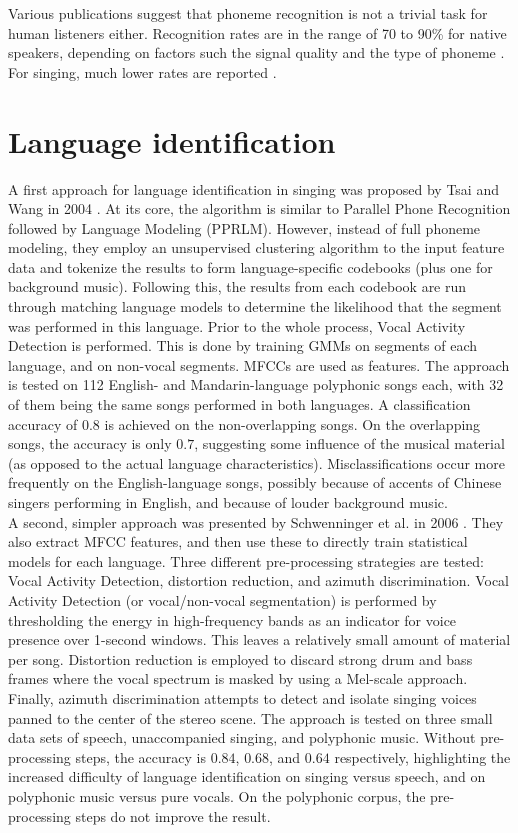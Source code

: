 Various publications suggest that phoneme recognition is not a trivial task for human listeners either. Recognition rates are in the range of 70 to 90\% for native speakers, depending on factors such the signal quality and the type of phoneme \cite{weber_smits}\cite{meyer_waechter}. For singing, much lower rates are reported \cite{hollien}.


\section{Language identification}
A first approach for language identification in singing was proposed by Tsai and Wang in 2004 \cite{tsai_wang}. At its core, the algorithm is similar to Parallel Phone Recognition followed by Language Modeling (PPRLM). However, instead of full phoneme modeling, they employ an unsupervised clustering algorithm to the input feature data and tokenize the results to form language-specific codebooks (plus one for background music). Following this, the results from each codebook are run through matching language models to determine the likelihood that the segment was performed in this language. Prior to the whole process, Vocal Activity Detection is performed. This is done by training GMMs on segments of each language, and on non-vocal segments. MFCCs are used as features.
The approach is tested on 112 English- and Mandarin-language polyphonic songs each, with 32 of them being the same songs performed in both languages. A classification accuracy of $0.8$ is achieved on the non-overlapping songs. On the overlapping songs, the accuracy is only $0.7$, suggesting some influence of the musical material (as opposed to the actual language characteristics). Misclassifications occur more frequently on the English-language songs, possibly because of accents of Chinese singers performing in English, and because of louder background music.\\

A second, simpler approach was presented by Schwenninger et al. in 2006 \cite{schwenninger}. They also extract MFCC features, and then use these to directly train statistical models for each language. Three different pre-processing strategies are tested: Vocal Activity Detection, distortion reduction, and azimuth discrimination. Vocal Activity Detection (or vocal/non-vocal segmentation) is performed by thresholding the energy in high-frequency bands as an indicator for voice presence over 1-second windows. This leaves a relatively small amount of material per song. Distortion reduction is employed to discard strong drum and bass frames where the vocal spectrum is masked by using a Mel-scale approach. Finally, azimuth discrimination attempts to detect and isolate singing voices panned to the center of the stereo scene.
The approach is tested on three small data sets of speech, unaccompanied singing, and polyphonic music. Without pre-processing steps, the accuracy is $0.84$, $0.68$, and $0.64$ respectively, highlighting the increased difficulty of language identification on singing versus speech, and on polyphonic music versus pure vocals. On the polyphonic corpus, the pre-processing steps do not improve the result.\\

